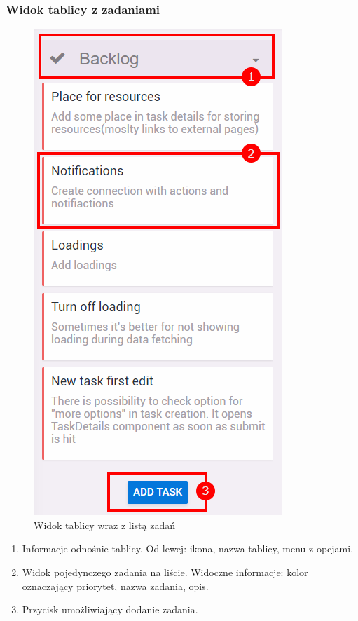 \documentclass[eng,printmode]{mgr}
\begin{document}
\subsubsection{Widok tablicy z zadaniami}
\begin{figure}[H]
  \begin{center}
  \includegraphics[scale=0.8]{task_list_board}
  \end{center}
  \caption{Widok tablicy wraz z listą zadań}
\end{figure}
\begin{enumerate}
  \item Informacje odnośnie tablicy. Od lewej: ikona, nazwa tablicy, menu z opcjami.
  \item Widok pojedynczego zadania na liście. Widoczne informacje: kolor oznaczający priorytet, nazwa zadania, opis.
  \item Przycisk umożliwiający dodanie zadania.
\end{enumerate}
\newpage
\end{document}
